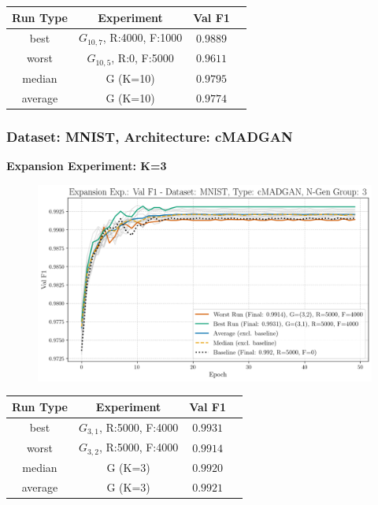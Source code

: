\begin{table}[H]
	\vspace{-1em}
	\centering
	\begin{tabular}{|c|c|c|c|}
		\hline
		Run Type & Experiment & Val F1 \\ \hline
		best & \(G_{10, 7}\), R:4000, F:1000 & $0.9889$\\ \hline
		worst & \(G_{10, 5}\), R:0, F:5000 & $0.9611$\\ \hline
		median & G (K=10) & $0.9795$\\ \hline
		average & G (K=10) & $0.9774$
		\\ \hline
	\end{tabular}
\end{table}
\newpage
\subsubsection{Dataset: MNIST, Architecture: cMADGAN} \label{app_strat_class_performance_cmadgan_mnist}
\noindent\textbf{Expansion Experiment: K=3}
\begin{figure}[htbp]
	\centering
	\includegraphics[width=.85\textwidth]{abb/strat_classifier_performance/MNIST_STRATIFIED_CLASSIFIERS_cMADGAN_NEW/expansion_experiments/val_f1_score_cMADGAN_MNIST_n_gen_3_all.png}
	\label{fig:app_strat_class_performance_expansion_exp._val_f1_score_3}
\end{figure}
\begin{table}[H]
	\vspace{-1em}
	\centering
	\begin{tabular}{|c|c|c|c|}
		\hline
		Run Type & Experiment & Val F1 \\ \hline
		best & \(G_{3, 1}\), R:5000, F:4000 & $0.9931$\\ \hline
		worst & \(G_{3, 2}\), R:5000, F:4000 & $0.9914$\\ \hline
		median & G (K=3) & $0.9920$\\ \hline
		average & G (K=3) & $0.9921$
		\\ \hline
	\end{tabular}
\end{table}
